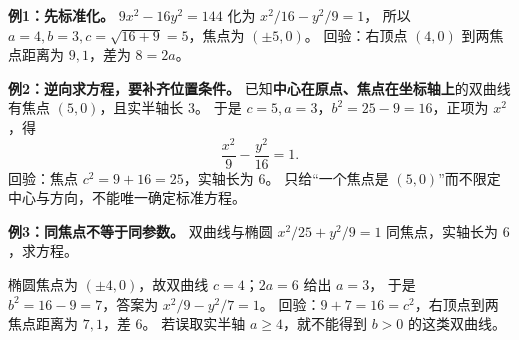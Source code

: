 \begin{examplebox}
\textbf{例1：先标准化。} $9x^2-16y^2=144$ 化为 $x^2/16-y^2/9=1$，
所以 $a=4,b=3,c=\sqrt{16+9}=5$，焦点为 $\boxed{(\pm5,0)}$。
回验：右顶点 $(4,0)$ 到两焦点距离为 $9,1$，差为 $8=2a$。

\medskip
\textbf{例2：逆向求方程，要补齐位置条件。}
已知\textbf{中心在原点、焦点在坐标轴上}的双曲线有焦点 $(5,0)$，且实半轴长 $3$。
于是 $c=5,a=3$，$b^2=25-9=16$，正项为 $x^2$，得
\[
 \boxed{\frac{x^2}{9}-\frac{y^2}{16}=1}.
\]
回验：焦点 $c^2=9+16=25$，实轴长为 $6$。
只给“一个焦点是 $(5,0)$”而不限定中心与方向，不能唯一确定标准方程。

\medskip
\textbf{例3：同焦点不等于同参数。}
双曲线与椭圆 $x^2/25+y^2/9=1$ 同焦点，实轴长为 $6$，求方程。

椭圆焦点为 $(\pm4,0)$，故双曲线 $c=4$；$2a=6$ 给出 $a=3$，
于是 $b^2=16-9=7$，答案为 $\boxed{x^2/9-y^2/7=1}$。
回验：$9+7=16=c^2$，右顶点到两焦点距离为 $7,1$，差 $6$。
若误取实半轴 $a\ge4$，就不能得到 $b>0$ 的这类双曲线。
\end{examplebox}
\clearpage
